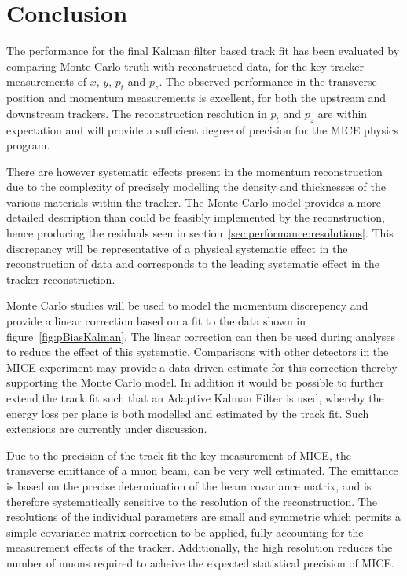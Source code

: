 \section{Conclusion}
\label{sec:Conclusion}

The performance for the final Kalman filter based track fit has been evaluated by comparing Monte Carlo truth with reconstructed data, for the key tracker measurements of $x$, $y$, $p_{t}$ and $p_z$.  The observed performance in the transverse position and momentum measurements is excellent, for both the upstream and downstream trackers. The reconstruction resolution in $p_t$ and $p_z$ are within expectation and will provide a sufficient degree of precision for the MICE physics program.

There are however systematic effects present in the momentum reconstruction due to the complexity of precisely modelling the density and thicknesses of the various materials within the tracker. The Monte Carlo model provides a more detailed description than could be feasibly implemented by the reconstruction, hence producing the residuals seen in section~\ref{sec:performance:resolutions}. This discrepancy will be representative of a physical systematic effect in the reconstruction of data and corresponds to the leading systematic effect in the tracker reconstruction.

Monte Carlo studies will be used to model the momentum discrepency and provide a linear correction based on a fit to the data shown in figure~\ref{fig:pBiasKalman}. The linear correction can then be used during analyses to reduce the effect of this systematic. Comparisons with other detectors in the MICE experiment may provide a data-driven estimate for this correction thereby supporting the Monte Carlo model. In addition it would be possible to further extend the track fit such that an Adaptive Kalman Filter is used, whereby the energy loss per plane is both modelled and estimated by the track fit. Such extensions are currently under discussion.

Due to the precision of the track fit the key measurement of MICE, the transverse emittance of a muon beam, can be very well estimated. The emittance is based on the precise determination of the beam covariance matrix, and is therefore systematically sensitive to the resolution of the reconstruction. The resolutions of the individual parameters are small and symmetric which permits a simple covariance matrix correction to be applied, fully accounting for the measurement effects of the tracker. Additionally, the high resolution reduces the number of muons required to acheive the expected statistical precision of MICE.

